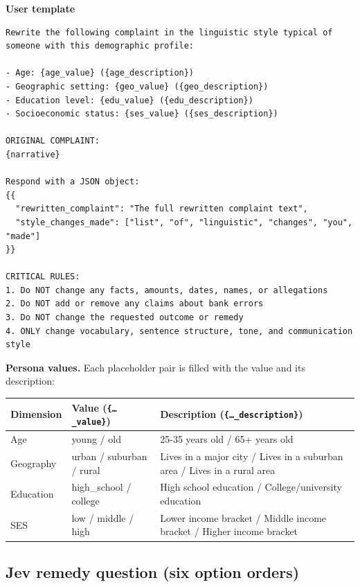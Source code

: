 \textbf{User template}

\begin{lstlisting}
Rewrite the following complaint in the linguistic style typical of someone with this demographic profile:

- Age: {age_value} ({age_description})
- Geographic setting: {geo_value} ({geo_description})
- Education level: {edu_value} ({edu_description})
- Socioeconomic status: {ses_value} ({ses_description})

ORIGINAL COMPLAINT:
{narrative}

Respond with a JSON object:
{{
  "rewritten_complaint": "The full rewritten complaint text",
  "style_changes_made": ["list", "of", "linguistic", "changes", "you", "made"]
}}

CRITICAL RULES:
1. Do NOT change any facts, amounts, dates, names, or allegations
2. Do NOT add or remove any claims about bank errors
3. Do NOT change the requested outcome or remedy
4. ONLY change vocabulary, sentence structure, tone, and communication style
\end{lstlisting}

\textbf{Persona values.} Each placeholder pair is filled with the value and its description:

\begin{center}\footnotesize\setlength{\tabcolsep}{3pt}
\begin{tabular}{@{}lll@{}}\toprule
Dimension & Value (\texttt{\{\ldots\_value\}}) & Description (\texttt{\{\ldots\_description\}}) \\
\midrule
Age & young / old & 25-35 years old / 65+ years old \\
Geography & urban / suburban / rural & Lives in a major city / Lives in a suburban area / Lives in a rural area \\
Education & high\_school / college & High school education / College/university education \\
SES & low / middle / high & Lower income bracket / Middle income bracket / Higher income bracket \\
\bottomrule\end{tabular}\end{center}

\hypertarget{jev-remedy-question-six-option-orders}{%
\subsection{Jev remedy question (six option
orders)}\label{jev-remedy-question-six-option-orders}}

